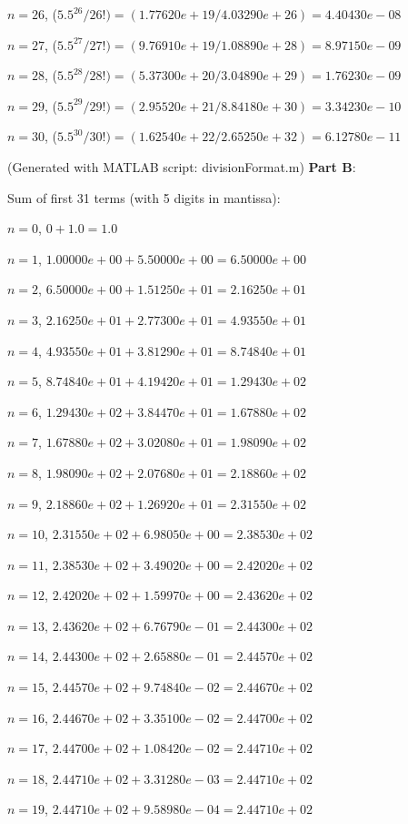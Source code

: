 \documentclass[12pt]{article}
\begin{document}
$n = 26$, ($5.5^{26} / 26!) = (1.77620e+19 / 4.03290e+26) = 4.40430e-08$

$n = 27$, ($5.5^{27} / 27!) = (9.76910e+19 / 1.08890e+28) = 8.97150e-09$

$n = 28$, ($5.5^{28} / 28!) = (5.37300e+20 / 3.04890e+29) = 1.76230e-09$

$n = 29$, ($5.5^{29} / 29!) = (2.95520e+21 / 8.84180e+30) = 3.34230e-10$

$n = 30$, ($5.5^{30} / 30!) = (1.62540e+22 / 2.65250e+32) = 6.12780e-11$

(Generated with MATLAB script: divisionFormat.m)
\newpage
\noindent
\textbf{Part B}:

Sum of first 31 terms (with 5 digits in mantissa):

$n = 0$, $0 + 1.0 = 1.0$

$n = 1$, $1.00000e+00 + 5.50000e+00 = 6.50000e+00$

$n = 2$, $6.50000e+00 + 1.51250e+01 = 2.16250e+01$

$n = 3$, $2.16250e+01 + 2.77300e+01 = 4.93550e+01$

$n = 4$, $4.93550e+01 + 3.81290e+01 = 8.74840e+01$

$n = 5$, $8.74840e+01 + 4.19420e+01 = 1.29430e+02$

$n = 6$, $1.29430e+02 + 3.84470e+01 = 1.67880e+02$

$n = 7$, $1.67880e+02 + 3.02080e+01 = 1.98090e+02$

$n = 8$, $1.98090e+02 + 2.07680e+01 = 2.18860e+02$

$n = 9$, $2.18860e+02 + 1.26920e+01 = 2.31550e+02$

$n = 10$, $2.31550e+02 + 6.98050e+00 = 2.38530e+02$

$n = 11$, $2.38530e+02 + 3.49020e+00 = 2.42020e+02$

$n = 12$, $2.42020e+02 + 1.59970e+00 = 2.43620e+02$

$n = 13$, $2.43620e+02 + 6.76790e-01 = 2.44300e+02$

$n = 14$, $2.44300e+02 + 2.65880e-01 = 2.44570e+02$

$n = 15$, $2.44570e+02 + 9.74840e-02 = 2.44670e+02$

$n = 16$, $2.44670e+02 + 3.35100e-02 = 2.44700e+02$

$n = 17$, $2.44700e+02 + 1.08420e-02 = 2.44710e+02$

$n = 18$, $2.44710e+02 + 3.31280e-03 = 2.44710e+02$

$n = 19$, $2.44710e+02 + 9.58980e-04 = 2.44710e+02$
\end{document}
